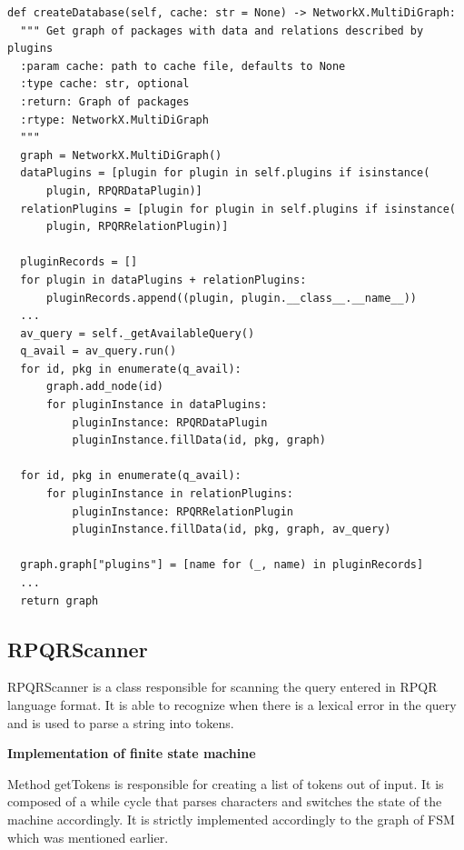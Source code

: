 \begin{lstlisting}
def createDatabase(self, cache: str = None) -> NetworkX.MultiDiGraph:
  """ Get graph of packages with data and relations described by plugins
  :param cache: path to cache file, defaults to None
  :type cache: str, optional
  :return: Graph of packages
  :rtype: NetworkX.MultiDiGraph
  """
  graph = NetworkX.MultiDiGraph()
  dataPlugins = [plugin for plugin in self.plugins if isinstance(
      plugin, RPQRDataPlugin)]
  relationPlugins = [plugin for plugin in self.plugins if isinstance(
      plugin, RPQRRelationPlugin)]

  pluginRecords = []
  for plugin in dataPlugins + relationPlugins:
      pluginRecords.append((plugin, plugin.__class__.__name__))
  ...
  av_query = self._getAvailableQuery()
  q_avail = av_query.run()
  for id, pkg in enumerate(q_avail):
      graph.add_node(id)
      for pluginInstance in dataPlugins:
          pluginInstance: RPQRDataPlugin
          pluginInstance.fillData(id, pkg, graph)

  for id, pkg in enumerate(q_avail):
      for pluginInstance in relationPlugins:
          pluginInstance: RPQRRelationPlugin
          pluginInstance.fillData(id, pkg, graph, av_query)

  graph.graph["plugins"] = [name for (_, name) in pluginRecords]
  ...
  return graph
\end{lstlisting}

\subsection*{RPQRScanner}
RPQRScanner is a class responsible for scanning the query entered in RPQR language format. It is able
to recognize when there is a lexical error in the query and is used to parse a string into tokens.

\textbf{Implementation of finite state machine}

Method getTokens is responsible for creating a list of tokens out of input. It is composed of
a while cycle that parses characters and switches the state of the machine accordingly. It is strictly
implemented accordingly to the graph of FSM which was mentioned earlier.

